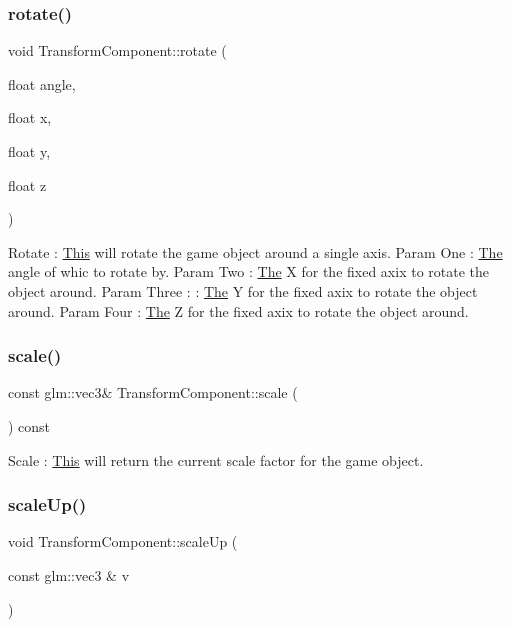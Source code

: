 \subsubsection{\texorpdfstring{rotate()}{rotate()}\hspace{0.1cm}{\footnotesize\ttfamily [2/2]}}
{\footnotesize\ttfamily void Transform\+Component\+::rotate (\begin{DoxyParamCaption}\item[{float}]{angle,  }\item[{float}]{x,  }\item[{float}]{y,  }\item[{float}]{z }\end{DoxyParamCaption})\hspace{0.3cm}{\ttfamily [inline]}}

Rotate \+: \mbox{\hyperlink{class_this}{This}} will rotate the game object around a single axis. Param One \+: \mbox{\hyperlink{class_the}{The}} angle of whic to rotate by. Param Two \+: \mbox{\hyperlink{class_the}{The}} X for the fixed axix to rotate the object around. Param Three \+: \+: \mbox{\hyperlink{class_the}{The}} Y for the fixed axix to rotate the object around. Param Four \+: \mbox{\hyperlink{class_the}{The}} Z for the fixed axix to rotate the object around. \mbox{\label{class_transform_component_a4b04c6a025c6be6bd0b9400827ee2291}} 
\subsubsection{\texorpdfstring{scale()}{scale()}}
{\footnotesize\ttfamily const glm\+::vec3\& Transform\+Component\+::scale (\begin{DoxyParamCaption}{ }\end{DoxyParamCaption}) const\hspace{0.3cm}{\ttfamily [inline]}}

Scale \+: \mbox{\hyperlink{class_this}{This}} will return the current scale factor for the game object. \mbox{\label{class_transform_component_a45483b2f5f38819ad0db6fcfe0f0ded8}} 
\subsubsection{\texorpdfstring{scale\+Up()}{scaleUp()}\hspace{0.1cm}{\footnotesize\ttfamily [1/2]}}
{\footnotesize\ttfamily void Transform\+Component\+::scale\+Up (\begin{DoxyParamCaption}\item[{const glm\+::vec3 \&}]{v }\end{DoxyParamCaption})\hspace{0.3cm}{\ttfamily [inline]}}

